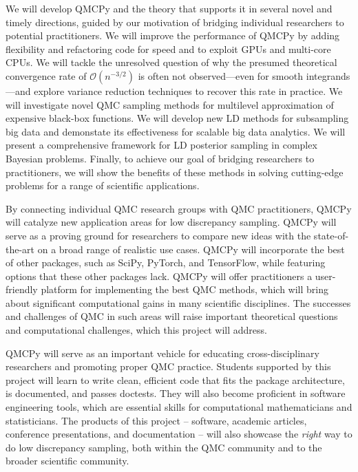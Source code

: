 \documentclass[11pt]{article}%
\begin{document}
\noindent We will develop QMCPy and the theory that supports it in several novel and timely directions, guided by our motivation of bridging individual researchers to potential practitioners. We will improve the performance of QMCPy by adding flexibility and refactoring code for speed and to exploit GPUs and multi-core CPUs.  We will tackle the unresolved question of why the presumed theoretical convergence rate of $\mathcal{O}(n^{-3/2})$ is often not observed---even for smooth integrands---and explore variance reduction techniques to recover this rate in practice. We will investigate novel QMC sampling methods for multilevel approximation of expensive black-box functions. We will develop new LD methods for subsampling big data and demonstate its effectiveness for scalable big data analytics. We will present a comprehensive framework for LD posterior sampling in complex Bayesian problems. Finally, to achieve our goal of bridging researchers to practitioners, we will show the benefits of these methods in solving cutting-edge problems for a range of scientific applications.

\bigskip


\noindent By connecting individual QMC research groups with QMC practitioners, QMCPy will catalyze new application areas for low discrepancy sampling. QMCPy will serve as a proving ground for researchers to compare new ideas with the state-of-the-art on a broad range of realistic use cases. QMCPy will incorporate the best of other packages, such as SciPy, PyTorch, and TensorFlow, while featuring options that these other packages lack. QMCPy will offer practitioners a user-friendly platform for implementing the best QMC methods, which will bring about significant computational gains in many scientific disciplines. The successes and challenges of QMC in such areas will raise important theoretical questions and computational challenges, which this project will address.

QMCPy will serve as an important vehicle for educating cross-disciplinary researchers and promoting proper QMC practice. Students supported by this project will learn to write clean, efficient code that fits the package architecture, is documented, and passes doctests. They will also become proficient in software engineering tools, which are essential skills for computational mathematicians and statisticians. The products of this project -- software, academic articles, conference presentations, and documentation -- will also showcase the \textit{right} way to do low discrepancy sampling, both within the QMC community and to the broader scientific community.
\end{document}
